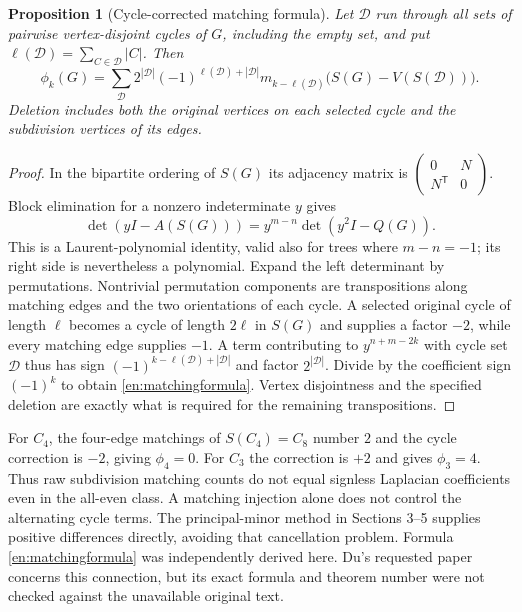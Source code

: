 \documentclass[12pt]{amsart}
\newtheorem{prop}[thm]{Proposition}
\theoremstyle{definition}
\theoremstyle{remark}
\numberwithin{equation}{section}
\newcommand{\N}{\mathbb{N}}
\begin{document}
\begin{prop}[Cycle-corrected matching formula]\label{en:matching}
Let $\mathscr D$ run through all sets of pairwise vertex-disjoint cycles
of $G$, including the empty set, and put $\ell(\mathscr D)=\sum_{C\in\mathscr D}|C|$.
Then
\begin{equation}\label{en:matchingformula}
 \phi_k(G)=\sum_{\mathscr D}
 2^{|\mathscr D|}(-1)^{\ell(\mathscr D)+|\mathscr D|}
 m_{k-\ell(\mathscr D)}\bigl(S(G)-V(S(\mathscr D))\bigr).
\end{equation}
Deletion includes both the original vertices on each selected cycle and
the subdivision vertices of its edges.
\end{prop}
\begin{proof}
In the bipartite ordering of $S(G)$ its adjacency matrix is
$\left(\begin{smallmatrix}0&N\\N^{\mathsf T}&0\end{smallmatrix}\right)$.
Block elimination for a nonzero indeterminate $y$ gives
\[
 \det(yI-A(S(G)))=y^{m-n}\det(y^2I-Q(G)).
\]
This is a Laurent-polynomial identity, valid also for trees where
$m-n=-1$; its right side is nevertheless a polynomial. Expand the left
determinant by permutations. Nontrivial permutation components are
transpositions along matching edges and the two orientations of each
cycle. A selected original cycle of length $\ell$ becomes a cycle of
length $2\ell$ in $S(G)$ and supplies a factor $-2$, while every matching
edge supplies $-1$. A term contributing to $y^{n+m-2k}$ with cycle set
$\mathscr D$ thus has sign
$(-1)^{k-\ell(\mathscr D)+|\mathscr D|}$ and factor $2^{|\mathscr D|}$.
Divide by the coefficient sign $(-1)^k$ to obtain
\eqref{en:matchingformula}. Vertex disjointness and the specified deletion
are exactly what is required for the remaining transpositions.
\end{proof}

For $C_4$, the four-edge matchings of $S(C_4)=C_8$ number $2$ and the
cycle correction is $-2$, giving $\phi_4=0$. For $C_3$ the correction is
$+2$ and gives $\phi_3=4$. Thus raw subdivision matching counts do not
equal signless Laplacian coefficients even in the all-even class. A
matching injection alone does not control the alternating cycle terms.
The principal-minor method in Sections 3--5 supplies positive differences
directly, avoiding that cancellation problem. Formula
\eqref{en:matchingformula} was independently derived here. Du's requested
paper \cite{en-du} concerns this connection, but its exact formula and
theorem number were not checked against the unavailable original text.
\end{document}
